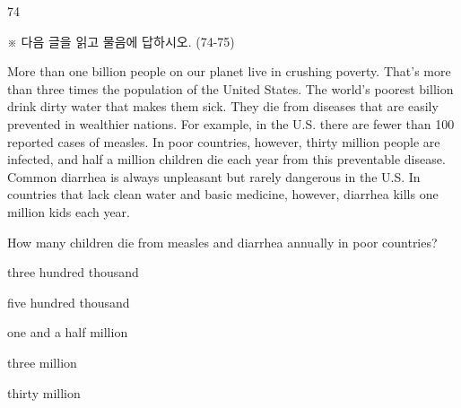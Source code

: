 \begin{question}{74}
\begin{framedtext}
※ 다음 글을 읽고 물음에 답하시오. (74-75) \par
More than one billion people on our planet live in crushing poverty. That's more than three times the population of the United States. The world's poorest billion drink dirty water that makes them sick. They die from diseases that are easily prevented in wealthier nations. For example, in the U.S. there are fewer than 100 reported cases of measles. In poor countries, however, thirty million people are infected, and half a million children die each year from this preventable disease. Common diarrhea is always unpleasant but rarely dangerous in the U.S. In countries that lack clean water and basic medicine, however, diarrhea kills one million kids each year. \par
\end{framedtext}
How many children die from measles and diarrhea annually in poor countries?
\begin{choices}
  \item three hundred thousand
  \item five hundred thousand
  \item one and a half million
  \item three million
  \item thirty million
\end{choices}
\end{question}
